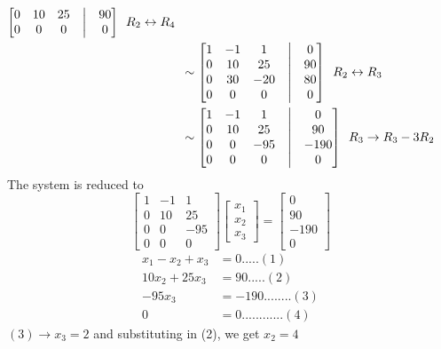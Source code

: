 \documentclass[
  letterpaper,
  DIV=11,
  numbers=noendperiod]{scrreprt}
\begin{document}
\begin{align*}
\begin{bmatrix}
    0 &10 &25 &\bigm| &90\\
    0 &0 &0 &\bigm| &0
\end{bmatrix}\begin{array}{c}
    R_2\leftrightarrow R_4
\end{array}\\
&\sim \begin{bmatrix}
    1 &-1  &1 &\bigm| &0\\
    0 &10 &25 &\bigm| &90\\
    0 &30 &-20 &\bigm| &80\\
        0 &0 &0 &\bigm| &0
\end{bmatrix}\begin{array}{c}
    R_2\leftrightarrow R_3
\end{array}\\
&\sim \begin{bmatrix}
    1 &-1  &1 &\bigm| &0\\
    0 &10 &25 &\bigm| &90\\
    0 &0 &-95 &\bigm| &-190\\
    0 &0 &0 &\bigm| &0
\end{bmatrix}\begin{array}{c}
    R_3\rightarrow R_3-3R_2
\end{array}\\
\end{align*} The system is reduced to \[\begin{bmatrix}
    1 &-1 &1\\
    0 &10 &25\\
    0 &0 &-95\\
    0 &0 &0
\end{bmatrix}\begin{bmatrix}
    x_1\\
    x_2\\
    x_3
\end{bmatrix}=\begin{bmatrix}
    0\\
    90\\
    -190\\
    0
\end{bmatrix}\] \begin{align*}
    x_1-x_2+x_3 &=0.....(1)\\
    10x_2+25x_3 &=90.....(2)\\
    -95x_3 &=-190........(3)\\
    0 &=0............(4)
\end{align*} \((3)\rightarrow x_3=2\) and substituting in (2), we get
\(x_2=4\)
\end{document}
